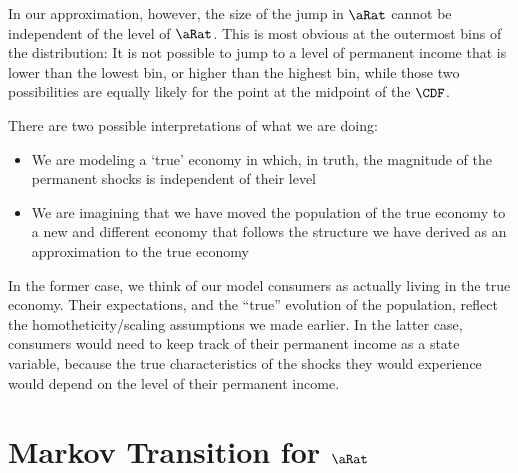 \documentclass[\econtexRoot/BufferStockTheory.tex]{subfiles}
\begin{document}
In our approximation, however, the size of the jump in $\pnt$ cannot be independent of the level of $\pnt$.  This is most obvious at the outermost bins of the distribution: It is not possible to jump to a level of permanent income that is lower than the lowest bin, or higher than the highest bin, while those two possibilities are equally likely for the point at the midpoint of the $\CDF$.  

There are two possible interpretations of what we are doing:
\begin{itemize}
\item We are modeling a `true' economy in which, in truth, the magnitude of the permanent shocks is independent of their level
\item We are imagining that we have moved the population of the true economy to a new and different economy that follows the structure we have derived as an approximation to the true economy
\end{itemize}

In the former case, we think of our model consumers as actually living in the true economy.  Their expectations, and the ``true'' evolution of the population, reflect the homotheticity/scaling assumptions we made earlier.  In the latter case, consumers would need to keep track of their permanent income as a state variable, because the true characteristics of the shocks they would experience would depend on the level of their permanent income.

\pagebreak


\section{Markov Transition for $\aRat$}

\begin{comment}
  Our derivations will be for consumers who are living in the `true' economy.  In that economy, the transition equation for $\aRat$ is:
  \subsection{Transition for $\aRat$}
  \begin{align}
    \aRat_{\tAbs+1} & = \Rfree (\PGro \pShk_{\tAbs+1})^{-1} \aRat_{\tAbs} + \tShk_{\tAbs+1} - \cFunc_{\tAbs+1}(\Rfree (\PGro \pShk_{\tAbs+1})^{-1}\aRat_{\tAbs}+\tShk_{\tAbs+1})
    \\                \Nxt{_{\tAbs+1}^{\aRat}(\aRat_{\tAbs+1}) & = \CDF_{\tAbs+1}^{\aRat}\left(\Rfree (\PGro \pShk_{\tAbs+1})^{-1} \aRat_{\tAbs} + \tShk_{\tAbs+1} - \cFunc_{\tAbs+1}(\Rfree (\PGro \pShk_{\tAbs+1})^{-1}\aRat_{\tAbs}+\tShk_{\tAbs+1})\right)
  \end{align}
\end{comment}
\end{document}
